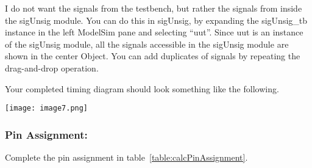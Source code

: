 I do not want the signals from the testbench, but rather the signals
from inside the sigUnsig module. You can do this in sigUnsig, by
expanding the sigUnsig\_tb instance in the left ModelSim pane and
selecting ``uut''. Since uut is an instance of the sigUnsig module, all
the signals accessible in the sigUnsig module are shown in the center
Object. You can add duplicates of signals by repeating the drag-and-drop
operation.

Your completed timing diagram should look something like the following.

\texttt{[image:  image7.png]}

\subsubsection{Pin Assignment:}

Complete the pin assignment in table~\ref{table:calcPinAssignment}.

